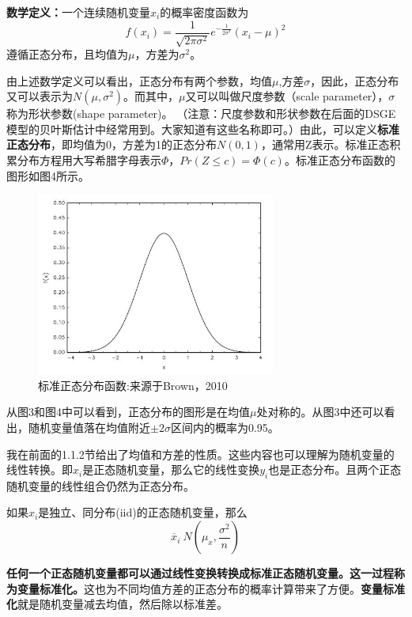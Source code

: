 \documentclass[cn,12pt,math=newtx,citestyle=gb7714-2015,bibstyle=gb7714-2015]{elegantbook}
\begin{document}
	\textbf{数学定义：}一个连续随机变量$x_i$的概率密度函数为
	\begin{equation}
		f(x_i)=\frac{1}{\sqrt{2\pi\sigma^2}}e^{-\frac{1}{2\sigma^2}}(x_i-\mu)^2
	\end{equation}
	遵循正态分布，且均值为$\mu$，方差为$\sigma^2$。
	
	由上述数学定义可以看出，正态分布有两个参数，均值$\mu$,方差$\sigma$，因此，正态分布又可以表示为$N(\mu,\sigma^2)$。而其中，$\mu$又可以叫做尺度参数（scale parameter），$\sigma$称为形状参数(shape parameter)。 （注意：尺度参数和形状参数在后面的DSGE模型的贝叶斯估计中经常用到。大家知道有这些名称即可。）由此，可以定义\textbf{标准正态分布}，即均值为0，方差为1的正态分布$N(0,1)$，通常用Z表示。标准正态积累分布方程用大写希腊字母表示$\Phi$，$Pr(Z\le{c})=\Phi(c)$。标准正态分布函数的图形如图4所示。
		\begin{figure}[htbp]
		\centering
		\includegraphics[width=0.7\textwidth]{snormal.jpg}
		\caption{标准正态分布函数:来源于Brown，2010}\label{fig:digit}
	\end{figure}
	

	
	从图3和图4中可以看到，正态分布的图形是在均值$\mu$处对称的。从图3中还可以看出，随机变量值落在均值附近$\pm2\sigma$区间内的概率为0.95。
	
	我在前面的1.1.2节给出了均值和方差的性质。这些内容也可以理解为随机变量的线性转换。即$x_i$是正态随机变量，那么它的线性变换$y_i$也是正态分布。且两个正态随机变量的线性组合仍然为正态分布。
	
	如果$x_i$是独立、同分布(iid)的正态随机变量，那么
	\begin{equation}
		\overline{x}_i~N(\mu_x,\frac{\sigma^2}{n})
	\end{equation}
	
	\textbf{任何一个正态随机变量都可以通过线性变换转换成标准正态随机变量。这一过程称为变量标准化。}这也为不同均值方差的正态分布的概率计算带来了方便。\textbf{变量标准化}就是随机变量减去均值，然后除以标准差。
	
\end{document}

